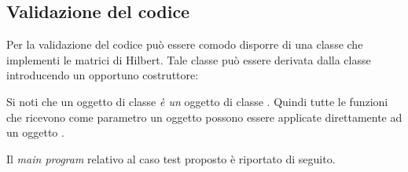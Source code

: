 \subsection*{Validazione del codice}
Per la validazione del codice pu\`o essere comodo disporre di una
classe che implementi le matrici di Hilbert. Tale classe pu\`o essere
derivata dalla classe  introducendo un opportuno
costruttore:
\lstset{basicstyle=\scriptsize\sf}

\lstset{basicstyle=\sf}
Si noti che un oggetto di classe  \emph{\`e un} oggetto
di classe . Quindi tutte le funzioni che ricevono come
parametro un oggetto  possono essere applicate
direttamente ad un oggetto . 

 Il \emph{main program} relativo al caso test
proposto \`e riportato di seguito.
%
\lstset{basicstyle=\scriptsize\sf}

\lstset{basicstyle=\sf}
